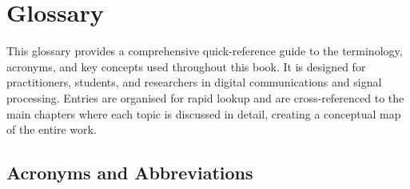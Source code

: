 
\chapter{Glossary}
\label{ch:glossary}

\begin{nontechnical}
    This glossary provides a comprehensive quick-reference guide to the terminology, acronyms, and key concepts used throughout this book. It is designed for practitioners, students, and researchers in digital communications and signal processing. Entries are organised for rapid lookup and are cross-referenced to the main chapters where each topic is discussed in detail, creating a conceptual map of the entire work.
\end{nontechnical}

\section{Acronyms and Abbreviations}

